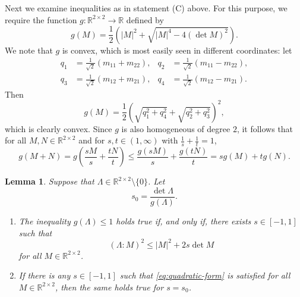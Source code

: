 \documentclass[a4paper]{article}
\newcommand{\R}{\mathbb{R}}
\newtheorem{lemma}[theorem]{Lemma}
\theoremstyle{definition}
\theoremstyle{remark}
\begin{document}
Next we examine inequalities as in statement (C) above. For this purpose, we
require the function $g \colon \R^{2 \times 2} \to \R$ defined by
\[
g(M) = \frac{1}{2} \left(|M|^2 + \sqrt{|M|^4 - 4(\det M)^2}\right).
\]
We note that $g$ is convex, which is most easily seen in different coordinates:
let
\begin{align*}
q_1 & = \frac{1}{\sqrt{2}} (m_{11} + m_{22}), & q_2 & = \frac{1}{\sqrt{2}} (m_{11} - m_{22}), \\
q_3 & = \frac{1}{\sqrt{2}} (m_{12} + m_{21}), & q_4 & = \frac{1}{\sqrt{2}} (m_{12} - m_{21}).
\end{align*}
Then
\[
g(M) = \frac{1}{2} \left(\sqrt{q_1^2 + q_4^2} + \sqrt{q_2^2 + q_3^2}\right)^2,
\]
which is clearly convex. Since $g$ is also homogeneous of degree $2$,
it follows that for all $M, N \in \R^{2 \times 2}$ and for
$s, t \in (1, \infty)$ with $\frac{1}{s} + \frac{1}{t} = 1$,
\begin{equation} \label{eq:interpolation-g}
g(M + N) = g\left(\frac{sM}{s} +  \frac{tN}{t}\right) \le \frac{g(sM)}{s} + \frac{g(tN)}{t} = sg(M) + tg(N).
\end{equation}

\begin{lemma} \label{lem:minimising-over-sigma}
Suppose that $\Lambda \in \R^{2 \times 2} \setminus \{0\}$. Let
\[
s_0 = \frac{\det \Lambda}{g(\Lambda)}.
\]
\begin{enumerate}
\item
The inequality $g(\Lambda) \le 1$ holds true if, and only if,
there exists $s \in [-1, 1]$ such that
\begin{equation} \label{eq:quadratic-form}
(\Lambda : M)^2 \le |M|^2 + 2s \det M
\end{equation}
for all $M \in \R^{2 \times 2}$.
\item If there is any $s \in [-1, 1]$ such that \eqref{eq:quadratic-form}
is satisfied for all $M \in \R^{2 \times 2}$, then the same holds true for
$s = s_0$.
\end{enumerate}
\end{lemma}
\end{document}
